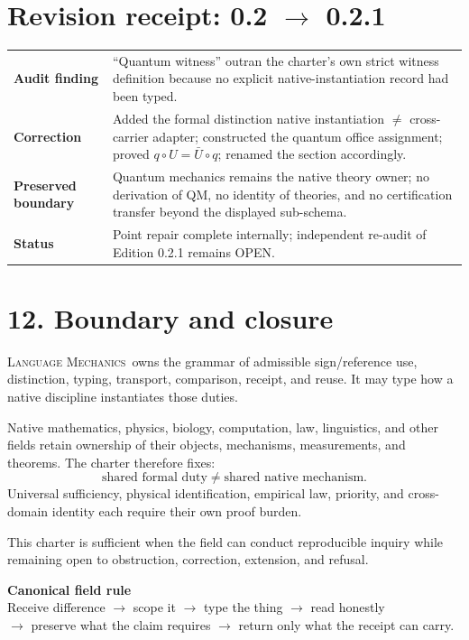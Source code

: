 \documentclass[10.5pt]{article}
\newcommand{\status}[1]{\textsf{#1}}
\newcommand{\LM}{\textsc{Language Mechanics}}
\begin{document}
\section*{Revision receipt: 0.2 $\rightarrow$ 0.2.1}
\begin{center}
\begin{tabularx}{0.96\textwidth}{>{\bfseries}p{}X}
\toprule
Audit finding & ``Quantum witness'' outran the charter's own strict witness definition because no explicit native-instantiation record had been typed.\\
Correction & Added the formal distinction native instantiation $\neq$ cross-carrier adapter; constructed the quantum office assignment; proved $q\circ U=\bar U\circ q$; renamed the section accordingly.\\
Preserved boundary & Quantum mechanics remains the native theory owner; no derivation of QM, no identity of theories, and no certification transfer beyond the displayed sub-schema.\\
Status & Point repair complete internally; independent re-audit of Edition 0.2.1 remains \status{OPEN}.\\
\bottomrule
\end{tabularx}
\end{center}

\section*{12. Boundary and closure}
\LM\ owns the grammar of admissible sign/reference use, distinction, typing, transport, comparison, receipt, and reuse. It may type how a native discipline instantiates those duties.

Native mathematics, physics, biology, computation, law, linguistics, and other fields retain ownership of their objects, mechanisms, measurements, and theorems. The charter therefore fixes:
\[
\boxed{\text{shared formal duty}\neq\text{shared native mechanism}.}
\]
Universal sufficiency, physical identification, empirical law, priority, and cross-domain identity each require their own proof burden.

This charter is sufficient when the field can conduct reproducible inquiry while remaining open to obstruction, correction, extension, and refusal.

\begin{rulebox}
\begin{center}
\textbf{Canonical field rule}\\[4pt]
Receive difference $\rightarrow$ scope it $\rightarrow$ type the thing $\rightarrow$ read honestly\\
$\rightarrow$ preserve what the claim requires $\rightarrow$ return only what the receipt can carry.
\end{center}
\end{rulebox}
\end{document}
